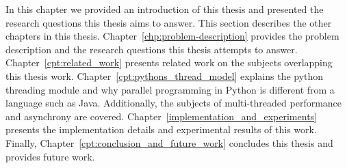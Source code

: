 In this chapter we provided an introduction of this thesis and presented the research questions this thesis aims to answer. 
This section describes the other chapters in this thesis.
Chapter~\ref{chp:problem-description} provides the problem description and the research questions this thesis attempts to answer.
Chapter~\ref{cpt:related_work} presents related work on the subjects overlapping this thesis work.
Chapter~\ref{cpt:pythons_thread_model} explains the python threading module and why parallel programming in Python is different from a language such as Java. Additionally, the subjects of multi-threaded performance and asynchrony are covered.
Chapter~\ref{implementation_and_experiments} presents the implementation details and experimental results of this work.
Finally, Chapter~\ref{cpt:conclusion_and_future_work} concludes this thesis and provides future work.
